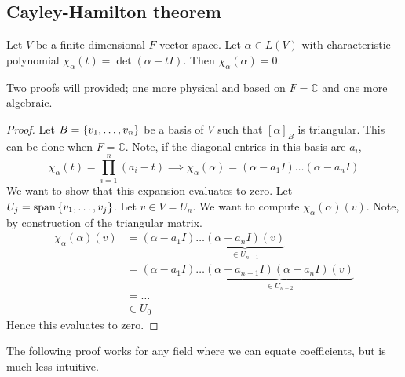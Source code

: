 \subsection{Cayley-Hamilton theorem}
\begin{theorem}
	Let \( V \) be a finite dimensional \( F \)-vector space.
	Let \( \alpha \in L(V) \) with characteristic polynomial \( \chi_\alpha(t) = \det(\alpha - t I) \).
	Then \( \chi_\alpha(\alpha) = 0 \).
\end{theorem}
Two proofs will provided; one more physical and based on \( F = \mathbb C \) and one more algebraic.
\begin{proof}
	Let \( B = \qty{v_1, \dots, v_n} \) be a basis of \( V \) such that \( [\alpha]_B \) is triangular.
	This can be done when \( F = \mathbb C \).
	Note, if the diagonal entries in this basis are \( a_i \),
	\[
		\chi_\alpha(t) = \prod_{i=1}^n (a_i - t) \implies \chi_\alpha(\alpha) = (\alpha - a_1 I) \dots (\alpha - a_n I)
	\]
	We want to show that this expansion evaluates to zero.
	Let \( U_j = \operatorname{span} \qty{v_1, \dots, v_j} \).
	Let \( v \in V = U_n \).
	We want to compute \( \chi_\alpha(\alpha)(v) \).
	Note, by construction of the triangular matrix.
	\begin{align*}
		\chi_\alpha(\alpha)(v) & = (\alpha - a_1 I) \dots \underbrace{(\alpha - a_n I)(v)}_{\in U_{n-1}}                     \\
		                       & = (\alpha - a_1 I) \dots \underbrace{(\alpha - a_{n-1} I)(\alpha - a_n I)(v)}_{\in U_{n-2}} \\
		                       & = \dots                                                                                     \\
		                       & \in U_0
	\end{align*}
	Hence this evaluates to zero.
\end{proof}
The following proof works for any field where we can equate coefficients, but is much less intuitive.
